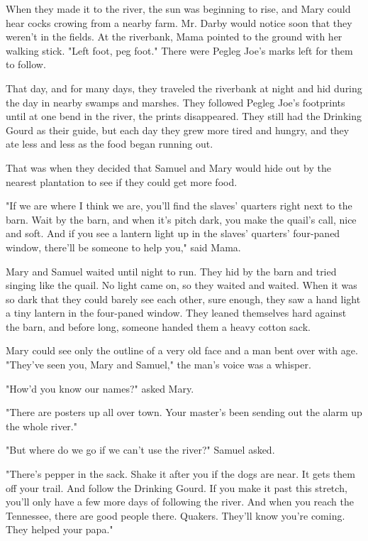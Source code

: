 When they made it to the river, the sun was beginning to rise, and Mary could hear cocks crowing from a nearby farm. Mr. Darby would notice soon that they weren't in the fields. At the riverbank, Mama pointed to the ground with her walking stick. "Left foot, peg foot." There were Pegleg Joe's marks left for them to follow.

That day, and for many days, they traveled the riverbank at night and hid during the day in nearby swamps and marshes. They followed Pegleg Joe's footprints until at one bend in the river, the prints disappeared. They still had the Drinking Gourd as their guide, but each day they grew more tired and hungry, and they ate less and less as the food began running out.

That was when they decided that Samuel and Mary would hide out by the nearest plantation to see if they could get more food.

"If we are where I think we are, you'll find the slaves' quarters right next to the barn. Wait by the barn, and when it's pitch dark, you make the quail's call, nice and soft. And if you see a lantern light up in the slaves' quarters' four-paned window, there'll be someone to help you," said Mama.

Mary and Samuel waited until night to run. They hid by the barn and tried singing like the quail. No light came on, so they waited and waited. When it was so dark that they could barely see each other, sure enough, they saw a hand light a tiny lantern in the four-paned window. They leaned themselves hard against the barn, and before long, someone handed them a heavy cotton sack.

Mary could see only the outline of a very old face and a man bent over with age. "They've seen you, Mary and Samuel," the man's voice was a whisper.

"How'd you know our names?" asked Mary.

"There are posters up all over town. Your master's been sending out the alarm up the whole river."

"But where do we go if we can't use the river?" Samuel asked.

"There's pepper in the sack. Shake it after you if the dogs are near. It gets them off your trail. And follow the Drinking Gourd. If you make it past this stretch, you'll only have a few more days of following the river. And when you reach the Tennessee, there are good people there. Quakers. They'll know you're coming. They helped your papa."


